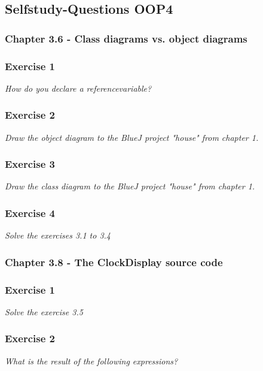 \subsection{Selfstudy-Questions OOP4}

\subsubsection{Chapter 3.6 - Class diagrams vs. object diagrams}

\subsubsection*{Exercise 1}
\textit{How do you declare a referencevariable?}\\


\subsubsection*{Exercise 2}
\textit{Draw the object diagram to the BlueJ project "house" from 
chapter 1.}\\


\subsubsection*{Exercise 3}
\textit{Draw the class diagram to the BlueJ project "house" from
chapter 1.}\\


\subsubsection*{Exercise 4}
\textit{Solve the exercises 3.1 to 3.4}\\

\subsubsection{Chapter 3.8 - The ClockDisplay source code}

\subsubsection*{Exercise 1}
\textit{Solve the exercise 3.5}\\


\subsubsection*{Exercise 2}
\textit{What is the result of the following expressions?}\\

